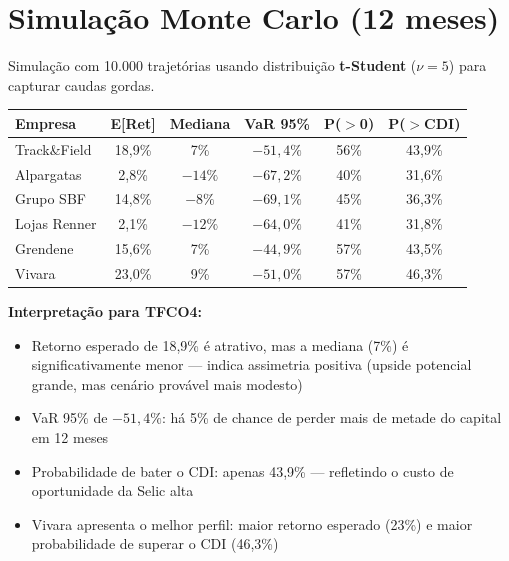 \documentclass[12pt, a4paper]{article}
\begin{document}
\section{Simulação Monte Carlo (12 meses)}

Simulação com 10.000 trajetórias usando distribuição \textbf{t-Student} ($\nu = 5$) para capturar caudas gordas.

\begin{center}
\small
\begin{tabular}{lccccc}
\toprule
\textbf{Empresa} & \textbf{E[Ret]} & \textbf{Mediana} & \textbf{VaR 95\%} & \textbf{P($>$0)} & \textbf{P($>$CDI)} \\
\midrule
\rowcolor{cinzatabela}
Track\&Field & 18,9\% & 7\% & $-51,4\%$ & 56\% & 43,9\% \\
Alpargatas & 2,8\% & $-14\%$ & $-67,2\%$ & 40\% & 31,6\% \\
\rowcolor{cinzatabela}
Grupo SBF & 14,8\% & $-8\%$ & $-69,1\%$ & 45\% & 36,3\% \\
Lojas Renner & 2,1\% & $-12\%$ & $-64,0\%$ & 41\% & 31,8\% \\
\rowcolor{cinzatabela}
Grendene & 15,6\% & 7\% & $-44,9\%$ & 57\% & 43,5\% \\
Vivara & 23,0\% & 9\% & $-51,0\%$ & 57\% & 46,3\% \\
\bottomrule
\end{tabular}
\end{center}

\textbf{Interpretação para TFCO4:}
\begin{itemize}[leftmargin=*]
    \item Retorno esperado de 18,9\% é atrativo, mas a mediana (7\%) é significativamente menor --- indica assimetria positiva (upside potencial grande, mas cenário provável mais modesto)
    \item VaR 95\% de $-51,4\%$: há 5\% de chance de perder mais de metade do capital em 12 meses
    \item Probabilidade de bater o CDI: apenas 43,9\% --- refletindo o custo de oportunidade da Selic alta
    \item Vivara apresenta o melhor perfil: maior retorno esperado (23\%) e maior probabilidade de superar o CDI (46,3\%)
\end{itemize}

\end{document}
